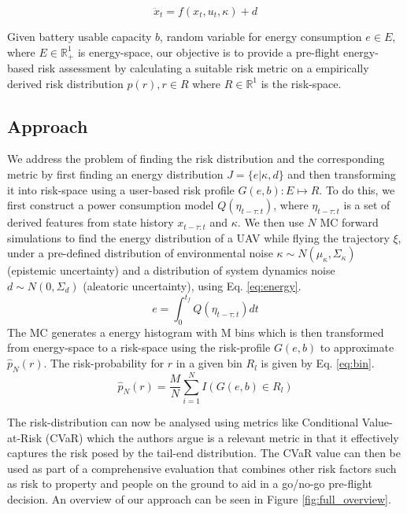 \documentclass[letterpaper, 10 pt, conference]{ieeeconf}
\begin{document}
\begin{equation}
\ddot{{x}}_{t} = f({x}_{t},{u}_{t}, \kappa) + {d} \label{eq:dynamics}
\end{equation}

Given battery usable capacity $b$, random variable for energy consumption $e \in E$, where $E \in \mathbb{R}^1_{+} $ is energy-space, our objective is to provide a pre-flight energy-based risk assessment by calculating a suitable risk metric on a empirically derived risk distribution $p(r), r \in R  $ where $R \in  \mathbb{R}^1$ is the risk-space.
\subsection{Approach}
We address the problem of finding the risk distribution and the corresponding metric by first finding an energy distribution $J = \{e|\kappa,{d}\}$ and then transforming it into risk-space using a user-based risk profile $G(e,b): E \mapsto R$. To do this, we first construct a power consumption model $ Q({\eta}_{t-\tau:t})$, where ${\eta}_{t-\tau:t}$ is a set of derived features from state history ${x}_{t-\tau:t}$ and $\kappa$. We then use $N$ MC forward simulations to find the energy distribution of a UAV while flying the trajectory $\xi$, under a pre-defined distribution of environmental noise $\kappa \sim N(\mu_{\kappa},\Sigma_{\kappa})$ (epistemic uncertainty) and a distribution of system dynamics noise ${d} \sim N(0,\Sigma_{d}) $ (aleatoric uncertainty), using Eq. \ref{eq:energy}.
\begin{equation}
e = \int_0^{t_f} Q({\eta}_{t-\tau:t}) dt
\label{eq:energy}
\end{equation}
The MC generates a energy histogram with M bins which is then transformed from energy-space to a risk-space using the risk-profile $G(e,b)$ to approximate $\hat{p}_N(r)$. The risk-probability for $r$ in a given bin $R_l$ is given by Eq. \ref{eq:bin}.
\begin{equation}
    \hat{p}_N(r) =  \frac{M}{N}\sum_{i=1}^N I(G(e,b) \in R_l) 
    \label{eq:bin}
\end{equation}

The risk-distribution can now be analysed using metrics like Conditional Value-at-Risk (CVaR) which the authors argue is a relevant metric in that it effectively captures the risk posed by the tail-end distribution. The CVaR value can then be used as part of a comprehensive evaluation that combines other risk factors such as risk to property and people on the ground to aid in a go/no-go pre-flight decision.
An overview of our approach can be seen in Figure \ref{fig:full_overview}.
\end{document}
